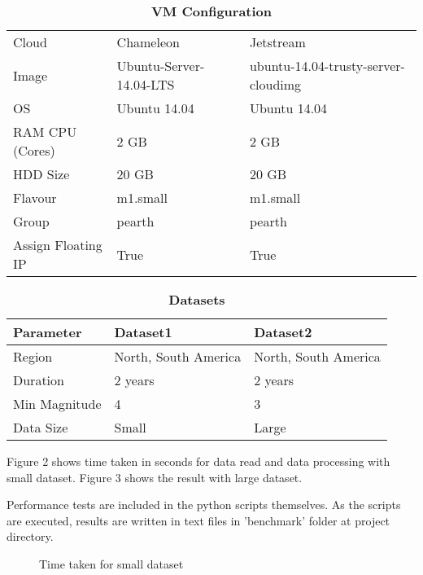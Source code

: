 \documentclass[9pt,twocolumn,twoside]{../../styles/osajnl}
\begin{document}
\begin{table}[htbp]
  
\caption{\bf VM Configuration}
\begin{tabular}{ m{5em} m{2.25cm} m{2.25cm} } 
\hline
Cloud & Chameleon & Jetstream \\ 
Image & Ubuntu-Server-14.04-LTS & ubuntu-14.04-trusty-server-cloudimg \\ 
OS & Ubuntu 14.04 & Ubuntu 14.04 \\ 
RAM CPU (Cores) & 2 GB & 2 GB \\ 
HDD Size & 20 GB & 20 GB \\ 
Flavour & m1.small & m1.small \\ 
Group & pearth & pearth \\ 
Assign Floating IP & True & True \\ 

\hline
\end{tabular}
\end{table} 

\begin{table}[htbp]
\caption{\bf Datasets}
\begin{tabular}{ m{5em} m{2cm} m{2cm} } 
\hline
Parameter & Dataset1 & Dataset2 \\ 
\hline
Region & North, South America & North, South America \\ 
Duration & 2 years & 2 years \\ 
Min Magnitude & 4 & 3 \\ 
Data Size & Small & Large \\ 

\hline
\end{tabular}
\end{table} 

Figure 2 shows time taken in seconds for data read and data processing with small dataset. Figure 3 shows the result with large dataset.

Performance tests are included in the python scripts themselves. As the scripts are executed, results are written in text files in 'benchmark' folder at project directory.

\begin{figure}[htbp]
\centering
{}
\caption{Time taken for small dataset} 
\label{fig:figure2}
\end{figure}
\end{document}
